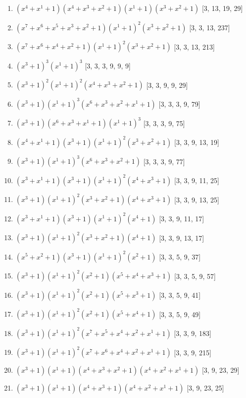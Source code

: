 \documentclass[10pt,twocolumn]{article}
\begin{document}
\begin{enumerate}
\item $(x^{4} + x^{1} + 1)(x^{4} + x^{3} + x^{2} + 1)(x^{1} + 1)(x^{3} + x^{2} + 1)$  [3, 13, 19, 29]
\item $(x^{7} + x^{6} + x^{5} + x^{3} + x^{2} + 1)(x^{1} + 1)^{2}(x^{3} + x^{2} + 1)$  [3, 3, 13, 237]
\item $(x^{7} + x^{6} + x^{4} + x^{2} + 1)(x^{1} + 1)^{2}(x^{3} + x^{2} + 1)$  [3, 3, 13, 213]
\item $(x^{3} + 1)^{3}(x^{1} + 1)^{3}$  [3, 3, 3, 9, 9, 9]
\item $(x^{3} + 1)^{2}(x^{1} + 1)^{2}(x^{4} + x^{3} + x^{2} + 1)$  [3, 3, 9, 9, 29]
\item $(x^{3} + 1)(x^{1} + 1)^{3}(x^{6} + x^{3} + x^{2} + x^{1} + 1)$  [3, 3, 3, 9, 79]
\item $(x^{3} + 1)(x^{6} + x^{3} + x^{1} + 1)(x^{1} + 1)^{3}$  [3, 3, 3, 9, 75]
\item $(x^{4} + x^{1} + 1)(x^{3} + 1)(x^{1} + 1)^{2}(x^{3} + x^{2} + 1)$  [3, 3, 9, 13, 19]
\item $(x^{3} + 1)(x^{1} + 1)^{3}(x^{6} + x^{3} + x^{2} + 1)$  [3, 3, 3, 9, 77]
\item $(x^{3} + x^{1} + 1)(x^{3} + 1)(x^{1} + 1)^{2}(x^{4} + x^{3} + 1)$  [3, 3, 9, 11, 25]
\item $(x^{3} + 1)(x^{1} + 1)^{2}(x^{3} + x^{2} + 1)(x^{4} + x^{3} + 1)$  [3, 3, 9, 13, 25]
\item $(x^{3} + x^{1} + 1)(x^{3} + 1)(x^{1} + 1)^{2}(x^{4} + 1)$  [3, 3, 9, 11, 17]
\item $(x^{3} + 1)(x^{1} + 1)^{2}(x^{3} + x^{2} + 1)(x^{4} + 1)$  [3, 3, 9, 13, 17]
\item $(x^{5} + x^{2} + 1)(x^{3} + 1)(x^{1} + 1)^{2}(x^{2} + 1)$  [3, 3, 5, 9, 37]
\item $(x^{3} + 1)(x^{1} + 1)^{2}(x^{2} + 1)(x^{5} + x^{4} + x^{3} + 1)$  [3, 3, 5, 9, 57]
\item $(x^{3} + 1)(x^{1} + 1)^{2}(x^{2} + 1)(x^{5} + x^{3} + 1)$  [3, 3, 5, 9, 41]
\item $(x^{3} + 1)(x^{1} + 1)^{2}(x^{2} + 1)(x^{5} + x^{4} + 1)$  [3, 3, 5, 9, 49]
\item $(x^{3} + 1)(x^{1} + 1)^{2}(x^{7} + x^{5} + x^{4} + x^{2} + x^{1} + 1)$  [3, 3, 9, 183]
\item $(x^{3} + 1)(x^{1} + 1)^{2}(x^{7} + x^{6} + x^{4} + x^{2} + x^{1} + 1)$  [3, 3, 9, 215]
\item $(x^{3} + 1)(x^{1} + 1)(x^{4} + x^{3} + x^{2} + 1)(x^{4} + x^{2} + x^{1} + 1)$  [3, 9, 23, 29]
\item $(x^{3} + 1)(x^{1} + 1)(x^{4} + x^{3} + 1)(x^{4} + x^{2} + x^{1} + 1)$  [3, 9, 23, 25]

\end{enumerate}
\end{document}
